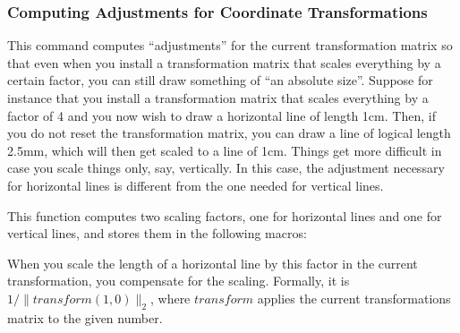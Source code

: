 \subsubsection{Computing Adjustments for Coordinate Transformations}
\label{section-adjustment-transformations}

\begin{command}{\pgftransformationadjustments}
    This command computes ``adjustments'' for the current transformation matrix
    so that even when you install a transformation matrix that scales
    everything by a certain factor, you can still draw something of ``an
    absolute size''. Suppose for instance that you install a transformation
    matrix that scales everything by a factor of 4 and you now wish to draw a
    horizontal line of length 1cm. Then, if you do not reset the transformation
    matrix, you can draw a line of logical length 2.5mm, which will then get
    scaled to a line of 1cm. Things get more difficult in case you scale things
    only, say, vertically. In this case, the adjustment necessary for
    horizontal lines is different from the one needed for vertical lines.

    This function computes two scaling factors, one for horizontal lines
    and one for vertical lines, and stores them in the following macros:
    \begin{command}{\pgfhorizontaltransformationadjustment}
        When you scale the length of a horizontal line by this factor in the
        current transformation, you compensate for the scaling. Formally, it is
        $1/\|\mathit{transform}(1,0)\|_2$, where $\mathit{transform}$ applies
        the current transformations matrix to the given number.
\begin{codeexample}[]
\end{codeexample}
\begin{codeexample}[]
\end{codeexample}
\end{command}
\end{command}
